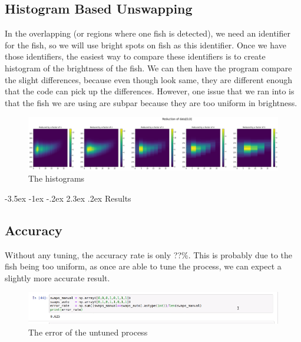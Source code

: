 \documentclass{article}
\makeatletter
\renewcommand\section{\clearpage\newpage\@startsection {section}{1}{\z@}%
	{-3.5ex \@plus -1ex \@minus -.2ex}%
	{2.3ex \@plus.2ex}%
	{\normalfont\Large\bfseries}}
\makeatother
\begin{document}
\subsection{Histogram Based Unswapping}
In the overlapping (or regions where one fish is detected), we need an identifier for the fish, so we will use bright spots on fish as this identifier. Once we have those identifiers, the easiest way to compare these identifiers is to create histogram of the brightness of the fish. We can then have the program compare the slight differences, because even though look same, they are different enough that the code can pick up the differences. However, one issue that we ran into is that the fish we are using are subpar because they are too uniform in brightness.


\begin{figure}[H]
	\centering
	\includegraphics[width=\linewidth]{reducedHist}
	\caption{The histograms}
	\label{fig:reducedHist}
\end{figure}


\section{Results}

\subsection{Accuracy}

Without any tuning, the accuracy rate is only ??\%. This is probably due to the fish being too uniform, as once are able to tune the process, we can expect a slightly more accurate result.

\begin{figure}[H]
	\centering
	\includegraphics[width=.75\linewidth]{error}
	\caption{The error of the untuned process}
\end{figure}
\end{document}
